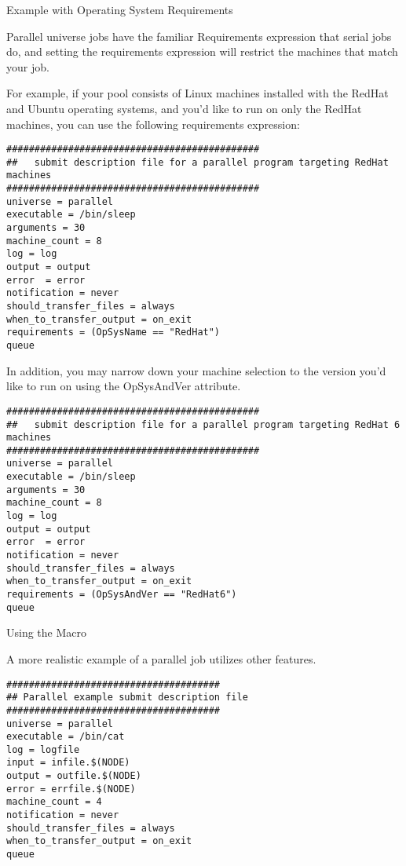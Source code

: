 \begin{description}
\item[Example with Operating System Requirements]
\end{description}

Parallel universe jobs have the familiar Requirements expression
that serial jobs do, and setting the requirements expression will
restrict the machines that match your job.

For example, if your pool consists of Linux machines installed with the RedHat and Ubuntu operating systems, and you'd like to run on only the RedHat machines, you can use
the following requirements expression:

\begin{verbatim}
#############################################
##   submit description file for a parallel program targeting RedHat machines
#############################################
universe = parallel
executable = /bin/sleep
arguments = 30
machine_count = 8
log = log
output = output
error  = error
notification = never
should_transfer_files = always
when_to_transfer_output = on_exit
requirements = (OpSysName == "RedHat")
queue 

\end{verbatim}

In addition, you may narrow down your machine selection to the version you'd like to run on using the OpSysAndVer attribute.

\begin{verbatim}
#############################################
##   submit description file for a parallel program targeting RedHat 6 machines
#############################################
universe = parallel
executable = /bin/sleep
arguments = 30
machine_count = 8
log = log
output = output
error  = error
notification = never
should_transfer_files = always
when_to_transfer_output = on_exit
requirements = (OpSysAndVer == "RedHat6")
queue
\end{verbatim}

\begin{description}
\item[Using the  Macro]
\end{description}

A more realistic example of a parallel job utilizes other features.

\begin{verbatim}
######################################
## Parallel example submit description file
######################################
universe = parallel
executable = /bin/cat
log = logfile
input = infile.$(NODE)
output = outfile.$(NODE)
error = errfile.$(NODE)
machine_count = 4
notification = never
should_transfer_files = always
when_to_transfer_output = on_exit
queue
\end{verbatim}

